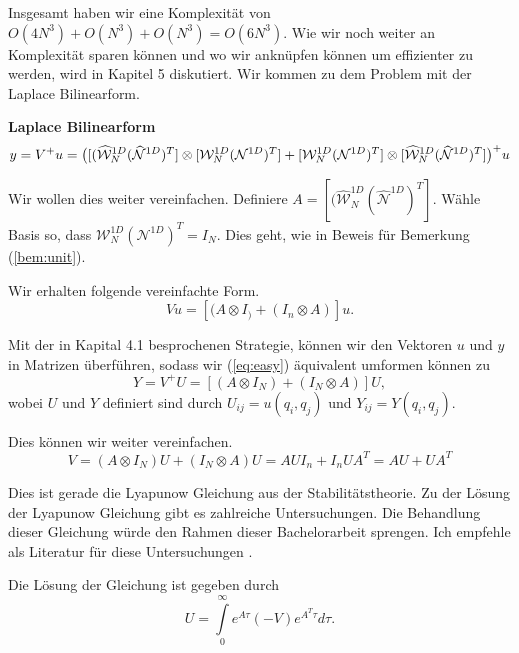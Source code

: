 Insgesamt haben wir eine Komplexität von $O(4N^3)+O(N^3)+O(N^3)=O(6N^3)$.
Wie wir noch weiter an Komplexität sparen können und wo wir anknüpfen können um effizienter zu werden, wird in Kapitel 5 diskutiert.
Wir kommen zu dem Problem mit der Laplace Bilinearform.

\vspace*{1cm}
\textbf{Laplace Bilinearform}
\begin{equation*}
y=V^{+}u = \big{(} [(\widehat{\mathcal{W}}_N^{1D} (\widehat{\mathcal{N}}^{1D})^T] \otimes [\mathcal{W}_N^{1D} (\mathcal{N}^{1D})^T]  +  [\mathcal{W}_N^{1D} (\mathcal{N}^{1D})^T] \otimes [\widehat{\mathcal{W}}_N^{1D} (\widehat{\mathcal{N}}^{1D})^T]  \big{)}^+ u
\end{equation*}

Wir wollen dies weiter vereinfachen. Definiere $A=[(\widehat{\mathcal{W}}_N^{1D} (\widehat{\mathcal{N}}^{1D})^T]$. Wähle Basis so, dass $\mathcal{W}_N^{1D} (\mathcal{N}^{1D})^T  = I_N$. Dies geht, wie in Beweis für Bemerkung (\ref{bem:unit}).

Wir erhalten folgende vereinfachte Form.
\begin{equation*} \label{eq:easy}
Vu =[(A \otimes I_) + (I_n \otimes A)]u.
\end{equation*}

Mit der in Kapital 4.1 besprochenen Strategie, können wir den Vektoren $u$ und $y$ in Matrizen überführen, sodass wir (\ref{eq:easy}) äquivalent umformen können zu
\begin{equation*} \label{eq:easy}
Y=V^{+}U =[(A \otimes I_N) + (I_N \otimes A)]U,
\end{equation*}
wobei $U$  und $Y$ definiert sind durch $U_{ij}=u(q_i,q_j)$ und $Y_{ij}=Y(q_i,q_j)$.

Dies können wir weiter vereinfachen.
\begin{equation*} \label{eq:easy}
V=(A \otimes I_N)U + (I_N \otimes A)U = AUI_n + I_n U A^T = AU + UA^T
\end{equation*}

Dies ist gerade die Lyapunow Gleichung aus der Stabilitätstheorie. Zu der Lösung der Lyapunow Gleichung gibt es zahlreiche Untersuchungen. Die Behandlung dieser Gleichung würde den Rahmen dieser Bachelorarbeit sprengen. Ich empfehle als Literatur für diese Untersuchungen \cite{Lyapunov}.

Die Lösung der Gleichung ist gegeben durch
\begin{equation*}
U = \int\limits_{0}^{\infty} e^{A \tau} (-V) e^{A^T \tau} d\tau.
\end{equation*}

